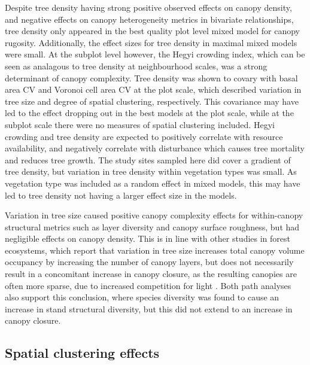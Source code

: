 \begin{refsection}
Despite tree density having strong positive observed effects on canopy density, and negative effects on canopy heterogeneity metrics in bivariate relationships, tree density only appeared in the best quality plot level mixed model for canopy rugosity. Additionally, the effect sizes for tree density in maximal mixed models were small. At the subplot level however, the Hegyi crowding index, which can be seen as analagous to tree density at neighbourhood scales, was a strong determinant of canopy complexity. Tree density was shown to covary with basal area CV and Voronoi cell area CV at the plot scale, which described variation in tree size and degree of spatial clustering, respectively. This covariance may have led to the effect dropping out in the best models at the plot scale, while at the subplot scale there were no measures of spatial clustering included. Hegyi crowding and tree density are expected to positively correlate with resource availability, and negatively correlate with disturbance which causes tree mortality and reduces tree growth. The study sites sampled here did cover a gradient of tree density, but variation in tree density within vegetation types was small. As vegetation type was included as a random effect in mixed models, this may have led to tree density not having a larger effect size in the models.

Variation in tree size caused positive canopy complexity effects for within-canopy structural metrics such as layer diversity and canopy surface roughness, but had negligible effects on canopy density. This is in line with other studies in forest ecosystems, which report that variation in tree size increases total canopy volume occupancy by increasing the number of canopy layers, but does not necessarily result in a concomitant increase in canopy closure, as the resulting canopies are often more sparse, due to increased competition for light \citep{Beland2021a}. Both path analyses also support this conclusion, where species diversity was found to cause an increase in stand structural diversity, but this did not extend to an increase in canopy closure. 

\subsection{Spatial clustering effects}
\label{tls:ssec:clustering}


\end{refsection}
